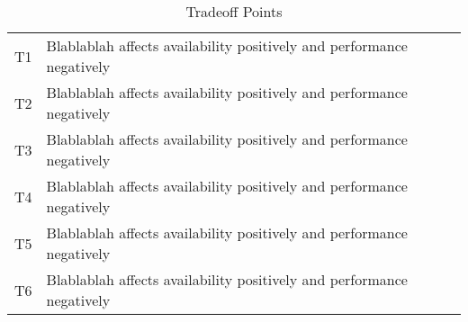\begin{table}[H]
	\begin{center}
		\begin{tabular}{| c | p{14cm} | }
    		\hline
			T1		&	Blablablah affects availability positively and performance negatively		\\
			T2		& 	Blablablah affects availability positively and performance negatively 		\\	
			T3		&	Blablablah affects availability positively and performance negatively		\\
			T4		& 	Blablablah affects availability positively and performance negatively		\\															
			T5		&	Blablablah affects availability positively and performance negatively		\\
			T6		& 	Blablablah affects availability positively and performance negatively		\\																													
			\hline
    	\end{tabular}
	\end{center}
	\label{tab:tradeoffPoints}
	\caption{Tradeoff Points}
\end{table}
